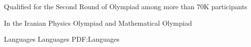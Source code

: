 \documentclass[letterpaper,MMMyyyy,nonstopmode]{simpleresumecv}
\begin{document}
\begin{Body}
\Gap
\BulletItem
Qualified for the Second Round of Olympiad
among more than 70K participants
\hfill
\textsl{\small{}}
\begin{Detail}
\Item
In the Iranian Physics Olympiad and Mathematical Olympiad
\end{Detail}











\Section
{Languages}
{Languages}
{PDF:Languages}


\end{Body}
\end{document}
